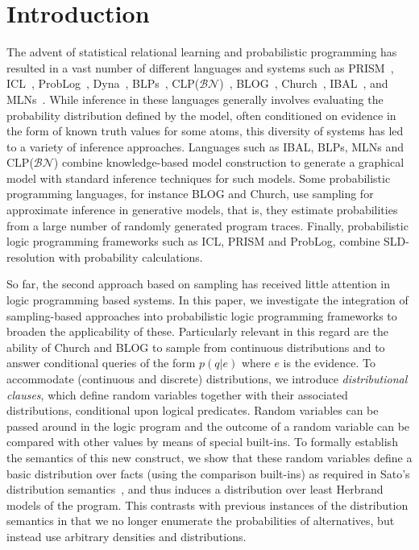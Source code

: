 \documentclass{tlp}
\begin{document}
\section{Introduction} 
The advent of statistical relational learning
\cite{Getoor07,DeRaedtAPRIL08} and probabilistic programming
\cite{NIPSWorkshop} has resulted in a vast number of different languages and systems such as
PRISM~\cite{SatoKameya:01}, ICL~\cite{Poole08},
ProbLog~\cite{DeRaedt07-IJCAIa}, Dyna~\cite{Eisner05},
BLPs~\cite{Kersting08}, CLP($\mathcal{BN}$)~\cite{clpbn},
BLOG~\cite{Milch05}, Church~\cite{Goodman08}, IBAL~\cite{Pfeffer01},
and MLNs~\cite{Richardson:06}. While inference in these languages
generally involves evaluating the probability distribution defined by
the model, often conditioned on evidence in the form of known truth
values for some atoms, this diversity of systems has led to a variety
of inference approaches.  Languages such as IBAL, BLPs, MLNs and
CLP($\mathcal{BN}$) combine knowledge-based model construction to
generate a graphical model with standard inference techniques for such
models.  Some probabilistic programming languages, for instance BLOG
and Church, use sampling for approximate inference in generative
models, that is, they estimate probabilities from a large number of
randomly generated program traces. Finally, probabilistic logic
programming frameworks such as ICL, PRISM and ProbLog, combine
SLD-resolution with probability calculations.

So far, the second approach based on sampling has received little
attention in logic programming based systems.  In this paper, we
investigate the integration of sampling-based approaches into
probabilistic logic programming frameworks to broaden the
applicability of these.  Particularly relevant in this regard are the
ability of Church and BLOG to sample from continuous distributions and
to answer conditional queries of the form $p(q |e )$ where $e$ is the
evidence.  To accommodate (continuous and discrete) distributions, we
introduce \emph{distributional clauses}, which define random variables
together with their associated distributions, conditional upon logical
predicates.  Random variables can be passed around in the logic
program and the outcome of a random variable can be compared with
other values by means of special built-ins.  To formally establish the
semantics of this new construct, we show that these random variables
define a basic distribution over facts (using the comparison
built-ins) as required in Sato's distribution
semantics~\cite{Sato:95}, and thus induces a distribution over least
Herbrand models of the program. This contrasts with previous instances
of the distribution semantics in that we no longer enumerate the
probabilities of alternatives, but instead use arbitrary densities and
distributions. 
\end{document}
